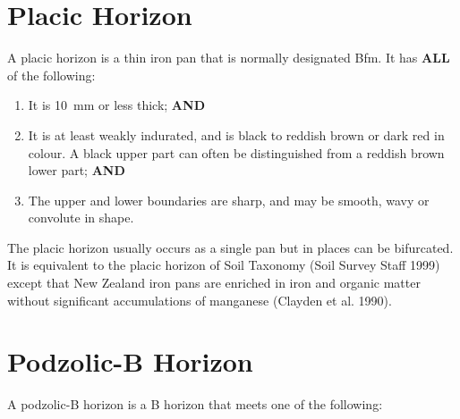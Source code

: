 \documentclass[
  letterpaper,
  DIV=11,
  numbers=noendperiod]{scrreprt}
\providecommand{\tightlist}{%
  \setlength{\itemsep}{0pt}\setlength{\parskip}{0pt}}\usepackage{longtable,booktabs,array}
\begin{document}
\hypertarget{sec-diag-plac}{%
\section{Placic Horizon}\label{sec-diag-plac}}

A placic horizon is a thin iron pan that is normally designated Bfm. It
has \textbf{ALL} of the following:

\begin{enumerate}
\def\labelenumi{\arabic{enumi}.}
\tightlist
\item
  It is 10~mm or less thick; \textbf{AND}
\item
  It is at least weakly indurated, and is black to reddish brown or dark
  red in colour. A black upper part can often be distinguished from a
  reddish brown lower part; \textbf{AND}
\item
  The upper and lower boundaries are sharp, and may be smooth, wavy or
  convolute in shape.
\end{enumerate}

The placic horizon usually occurs as a single pan but in places can be
bifurcated. It is equivalent to the placic horizon of Soil Taxonomy
(Soil Survey Staff 1999) except that New Zealand iron pans are enriched
in iron and organic matter without significant accumulations of
manganese (Clayden et al. 1990).

\hypertarget{sec-diag-podzb}{%
\section{Podzolic-B Horizon}\label{sec-diag-podzb}}

A podzolic-B horizon is a B horizon that meets one of the following:
\end{document}
